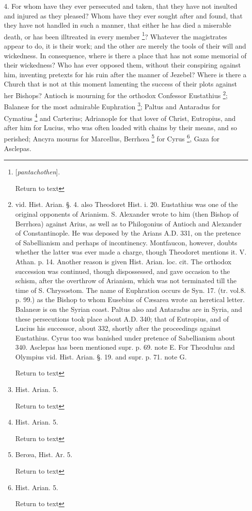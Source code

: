 4. For whom have they ever persecuted and taken,
that they have not insulted and injured as they pleased? Whom have
they ever sought after and found, that they have not handled in such a
manner, that either he has died a miserable death, or has been
illtreated in every member \footnote{[\emph{pantachothen}].

Return to text}?
Whatever the magistrates appear to do, it is their work; and the other
are merely the tools of their will and wickedness. In consequence,
where is there a place that has not some memorial of their wickedness?
Who has ever opposed them, without their conspiring against him,
inventing pretexts for his ruin after the manner of Jezebel? Where is
there a Church that is not at this moment lamenting the success of
their plots against her Bishops? Antioch is mourning for the orthodox
Confessor Eustathius \footnote{vid. Hist. Arian. §. 4. also Theodoret Hist.
i. 20. Eustathius was one of the original opponents of Arianism. S.
Alexander wrote to him (then Bishop of Berrhœa) against Arius, as
well as to Philogonius of Antioch and Alexander of Constantinople. He
was deposed by the Arians A.D.
331, on the pretence of Sabellianism and perhaps of incontinency.
Montfaucon, however, doubts whether the latter was ever made a charge,
though Theodoret mentions it. V. Athan. p. 14. Another reason is given
Hist. Arian. loc. cit. The orthodox succession was continued, though
dispossessed, and gave occasion to the schism, after the overthrow of
Arianism, which was not terminated till the time of S. Chrysostom. The
name of Euphration occurs de Syn. 17. (tr. vol.8. p. 99.) as the
Bishop to whom Eusebius of Cæsarea wrote an heretical letter. Balaneæ
is on the Syrian coast. Paltus also and Antaradus are in Syria, and
these persecutions took place about A.D. 340; that of Eutropius, and of Lucius his successor, about
332, shortly after the proceedings against Eustathius. Cyrus too was
banished under pretence of Sabellianism about 340. Asclepas has been
mentioned supr. p. 69. note E. For Theodulus and Olympius vid. Hist.
Arian. §. 19. and supr. p. 71. note G.

Return to text};
Balaneæ for the most admirable Euphration \footnote{Hist. Arian. 5.

Return to text}; Paltus and Antaradus for Cymatius \footnote{Hist. Arian. 5.

Return to text}
and Carterius; Adrianople for that lover of Christ, Eutropius, and
after him for Lucius, who was often loaded with chains by their means,
and so perished; Ancyra mourns for Marcellus, Berrhœa \footnote{Berœa, Hist. Ar. 5.

Return to text} for Cyrus \footnote{Hist. Arian. 5.

Return to text}, Gaza for Asclepas.

